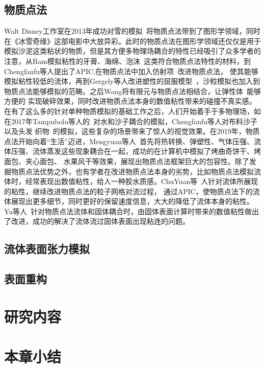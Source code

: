 \subsection{物质点法}
Walt Disney工作室在2013年成功对雪的模拟~\cite{stomakhin2013material}将物质点法带到了图形学领域，同时在《冰雪奇缘》这部电影中大放异彩。此时的物质点法在图形学领域还仅仅是用于
模拟沙泥这类粘状的物质，但是其方便多物理场耦合的特性已经吸引了众多学者的注意，从Ram模拟粘性的牙膏、海绵、泡沫~\cite{2015foams}这类符合物质点法特性的材料，到Chengfanfu等人提出了APIC,在物质点法中加入仿射项~\cite{jiang2015affine}改进物质点法，
使其能够模拟粘性较低的流体，再到Gergely等人改进塑性的屈服模型~\cite{klar2016drucker}，沙粒模拟也加入到物质点法能够模拟的范畴。之后Wang将有限元与物质点法相结合，让弹性体~\cite{2019WangDuctile}能够方便的
实现破碎效果，同时改进物质点法本身的数值粘性带来的碰撞不真实感。在有了这么多的针对单种物质模拟的基础工作之后，人们开始着手于多物理场，如在2017年Tampubolu等人的~\cite{tampubolon2017multi}对水和沙子耦合的模拟，Chengfanfu等人对布料沙子以及头发
织物~\cite{jiang2017anisotropic}的模拟，这些复杂的场景带来了惊人的视觉效果。在2019年，物质点法开始向着“生活”迈进，Mengyuan等人~\cite{Ding2019}首先将热转换、弹塑性、气体压强、流体压强、流体蒸发这些现象耦合在一起，成功的在计算机中模拟了烤曲奇饼干、烤面包、夹心面包、
水果风干等效果，展现出物质点法框架巨大的包容性。除了发掘物质点法优势之外，也有学者在改进物质点法本身的劣势，比如物质点法模拟流体时，经常表现出数值粘性，给人一种胶水质感。ChuYuan等~\cite{fu2017polynomial}人针对流体所展现的粘性，继续改进物质点法的粒子网格对流过程，
通过APIC，使物质点法下的流体展现出更多细节，同时更好的保留速度信息，大大的降低了流体本身的粘性。Yu等人~\cite{fang2020iq}针对物质点法流体和固体耦合时，由固体表面计算时带来的数值粘性做出了改进，成功的解决了流体流过固体表面出现粘连的问题。

\subsection{流体表面张力模拟}
\subsection{表面重构}
\section{研究内容}

\section{本章小结}

